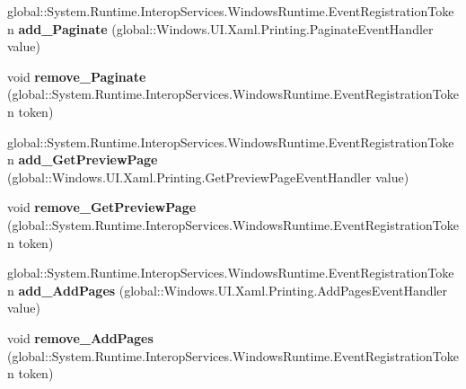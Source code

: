 \begin{DoxyCompactItemize}
\mbox{\label{interface_windows_1_1_u_i_1_1_xaml_1_1_printing_1_1_i_print_document_a9dbc873132dc18654e2b7e972080c41e}} 
global\+::\+System.\+Runtime.\+Interop\+Services.\+Windows\+Runtime.\+Event\+Registration\+Token {\bfseries add\+\_\+\+Paginate} (global\+::\+Windows.\+U\+I.\+Xaml.\+Printing.\+Paginate\+Event\+Handler value)
\item 
\mbox{\label{interface_windows_1_1_u_i_1_1_xaml_1_1_printing_1_1_i_print_document_a799ea5a2c39144ec765078426a3efac8}} 
void {\bfseries remove\+\_\+\+Paginate} (global\+::\+System.\+Runtime.\+Interop\+Services.\+Windows\+Runtime.\+Event\+Registration\+Token token)
\item 
\mbox{\label{interface_windows_1_1_u_i_1_1_xaml_1_1_printing_1_1_i_print_document_acb9d671a3b4a58e885771c4ec6c329d5}} 
global\+::\+System.\+Runtime.\+Interop\+Services.\+Windows\+Runtime.\+Event\+Registration\+Token {\bfseries add\+\_\+\+Get\+Preview\+Page} (global\+::\+Windows.\+U\+I.\+Xaml.\+Printing.\+Get\+Preview\+Page\+Event\+Handler value)
\item 
\mbox{\label{interface_windows_1_1_u_i_1_1_xaml_1_1_printing_1_1_i_print_document_aa975f5387eb09201d39628055f1bfb7d}} 
void {\bfseries remove\+\_\+\+Get\+Preview\+Page} (global\+::\+System.\+Runtime.\+Interop\+Services.\+Windows\+Runtime.\+Event\+Registration\+Token token)
\item 
\mbox{\label{interface_windows_1_1_u_i_1_1_xaml_1_1_printing_1_1_i_print_document_a6a0ff286beb8ddcdbe12d51a49010b97}} 
global\+::\+System.\+Runtime.\+Interop\+Services.\+Windows\+Runtime.\+Event\+Registration\+Token {\bfseries add\+\_\+\+Add\+Pages} (global\+::\+Windows.\+U\+I.\+Xaml.\+Printing.\+Add\+Pages\+Event\+Handler value)
\item 
\mbox{\label{interface_windows_1_1_u_i_1_1_xaml_1_1_printing_1_1_i_print_document_a78e46b68309d6b34dfdab7f6631761a6}} 
void {\bfseries remove\+\_\+\+Add\+Pages} (global\+::\+System.\+Runtime.\+Interop\+Services.\+Windows\+Runtime.\+Event\+Registration\+Token token)

\end{DoxyCompactItemize}
